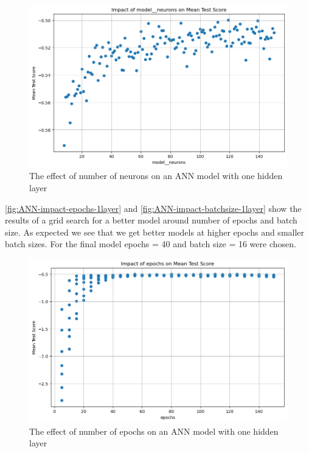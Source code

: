 \documentclass{article}
\begin{document}
\begin{figure}
	\centering
	\includegraphics[width=\linewidth]{figures/ANN_impact_neurons_1layer.png}
	\caption{The effect of number of neurons on an ANN model with one hidden layer}
	\label{fig:ANN-impact-neurons-1layer}
\end{figure}

\autoref{fig:ANN-impact-epochs-1layer} and \autoref{fig:ANN-impact-batchsize-1layer} show the results of a grid search for a better model around number of epochs and batch size.
As expected we see that we get better models at higher epochs and smaller batch sizes. For the final model epochs = 40 and batch size = 16 were chosen.

\begin{figure}
	\centering
	\includegraphics[width=\linewidth]{figures/ANN_impact_epochs_1layer.png}
	\caption{The effect of number of epochs on an ANN model with one hidden layer}
	\label{fig:ANN-impact-epochs-1layer}
\end{figure}
\end{document}
